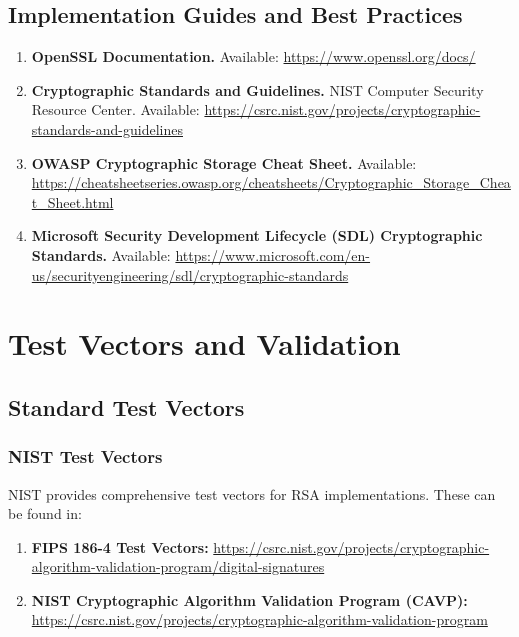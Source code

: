 \documentclass[11pt,a4paper]{article}
\begin{document}
\subsection{Implementation Guides and Best Practices}

\begin{enumerate}
    \item \textbf{OpenSSL Documentation.} Available: \url{https://www.openssl.org/docs/}
    
    \item \textbf{Cryptographic Standards and Guidelines.} NIST Computer Security Resource Center. Available: \url{https://csrc.nist.gov/projects/cryptographic-standards-and-guidelines}
    
    \item \textbf{OWASP Cryptographic Storage Cheat Sheet.} Available: \url{https://cheatsheetseries.owasp.org/cheatsheets/Cryptographic_Storage_Cheat_Sheet.html}
    
    \item \textbf{Microsoft Security Development Lifecycle (SDL) Cryptographic Standards.} Available: \url{https://www.microsoft.com/en-us/securityengineering/sdl/cryptographic-standards}
\end{enumerate}

\section{Test Vectors and Validation}

\subsection{Standard Test Vectors}

\subsubsection{NIST Test Vectors}

NIST provides comprehensive test vectors for RSA implementations. These can be found in:

\begin{enumerate}
    \item \textbf{FIPS 186-4 Test Vectors:} \url{https://csrc.nist.gov/projects/cryptographic-algorithm-validation-program/digital-signatures}
    
    \item \textbf{NIST Cryptographic Algorithm Validation Program (CAVP):} \url{https://csrc.nist.gov/projects/cryptographic-algorithm-validation-program}
\end{enumerate}
\end{document}
